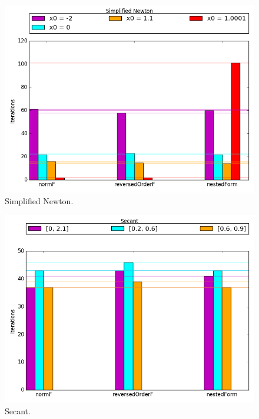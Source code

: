 \documentclass{article}
\begin{document}
			\begin{center} \begin{figure}[!ht]
				\begin{mdframed} \begin{center}
					\includegraphics[scale=0.6]{./imgs/Ex2SNwt.png}
					\caption{Simplified Newton.}
				\end{center} \end{mdframed}
				\label{fig:barPlot3}
			\end{figure} \end{center}


			\begin{center} \begin{figure}[!ht]
				\begin{mdframed} \begin{center}
					\includegraphics[scale=0.6]{./imgs/Ex2Sect.png}
					\caption{Secant.}
				\end{center} \end{mdframed}
				\label{fig:barPlot4}
			\end{figure} \end{center}
\end{document}
